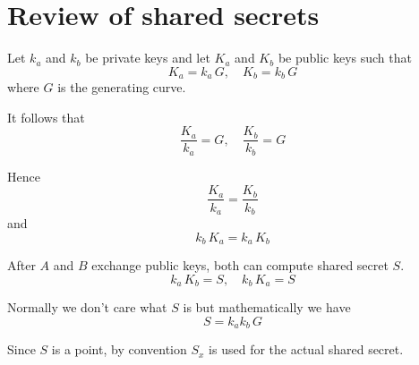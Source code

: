 \documentclass[12pt]{article}
\begin{document}
\section*{Review of shared secrets}

Let $k_a$ and $k_b$ be private keys and let $K_a$ and $K_b$ be public keys such that
\begin{equation*}
K_a=k_a\,G,\quad K_b=k_b\,G
\end{equation*}
where $G$ is the generating curve.

\bigskip
It follows that
\begin{equation*}
\frac{K_a}{k_a}=G,\quad \frac{K_b}{k_b}=G
\end{equation*}

Hence
\begin{equation*}
\frac{K_a}{k_a}=\frac{K_b}{k_b}
\end{equation*}
and
\begin{equation*}
k_b\,K_a=k_a\,K_b
\end{equation*}

After $A$ and $B$ exchange public keys, both can compute shared secret $S$.
\begin{equation*}
k_a\,K_b=S,\quad k_b\,K_a=S
\end{equation*}

Normally we don't care what $S$ is but mathematically we have
\begin{equation*}
S=k_ak_b\,G
\end{equation*}

Since $S$ is a point, by convention $S_x$ is used for the actual shared secret.
\end{document}
